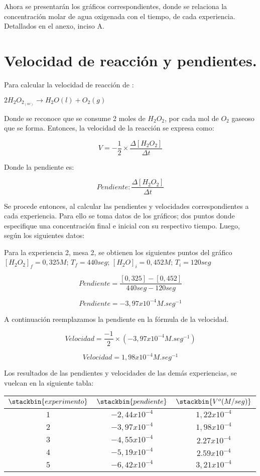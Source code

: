 \documentclass[a4paper,12pt]{article}
\begin{document}
  Ahora se presentarán los gráficos correspondientes, donde se relaciona la concentración molar de agua oxigenada con el tiempo, de cada experiencia. Detallados en el anexo, inciso A.
  
 \section{Velocidad de reacción y pendientes.}
   Para calcular la velocidad de reacción de : 
    
 \hspace{6cm}$2H_2O_{2_{(ac)}} \to H_2O{(l)}+O_2{(g)}$
 
  Donde se reconoce que se consume 2 moles de $H_2O_2$, por cada mol de $O_2$ gaseoso que se forma. Entonces, la velocidad de la reacción se expresa como:
  
 $$V= -\frac{1}{2}\times \frac{\Delta{[H_2O_2]}}{\Delta t}$$  
 
   Donde la pendiente es: 
 
 $$Pendiente:\frac{\Delta{[H_2O_2]}}{\Delta t}$$ 
 
   Se procede entonces, al calcular las pendientes y velocidades correspondientes a cada experiencia. 
   Para ello se toma datos de los gráficos; dos puntos donde especifique una concentración final e inicial con su respectivo tiempo. Luego, según los siguientes datos: 
   
     Para la experiencia 2, mesa 2, se obtienen los siguientes puntos del gráfico
  $[H_2O_2]_f=0,325M$; $T_f=440seg$; $[H_2O]_i=0,452M$; $T_i=120seg$
  
   $$Pendiente=\frac{[0,325] - [0,452]}{440seg - 120seg}$$
   
   $$Pendiente= -3,97x10^{-4} M.seg^{-1}$$
   
     A continuación reemplazamos la pendiente en la fórmula de la velocidad.
   
   $$Velocidad=\frac{-1}{2}\times(-3,97x10^{-4}M.seg^{-1})$$
   
   $$Velocidad= 1,98x10^{-4}M.seg^{-1}$$
   
   Los resultados de las pendientes y velocidades de las demás experiencias, se vuelcan en la siguiente tabla:
   
\begin{center}
\centering
\label{2}
\begin{tabular}{|c|c|c|}
\hline
$\stackbin{experimento}$ & $\stackbin{pendiente}$ & $\stackbin{V^o (M/seg)}$ \\ \hline 
$1$ & $- 2,44x10^{-4}$ & $1,22x10^{-4}$ \\ \hline 
$2$ & $- 3,97x10^{-4}$ & $1,98x10^{-4}$ \\ \hline
$3$ & $- 4,55x10^{-4}$ & $2.27x10^{-4}$ \\ \hline 
$4$ & $- 5,19x10^{-4}$ & $2.59x10^{-4}$ \\ \hline   
$5$ & $-6,42x10^{-4}$ & $3,21x10^{-4}$ \\ \hline 
\end{tabular}
\end{center}
\end{document}
